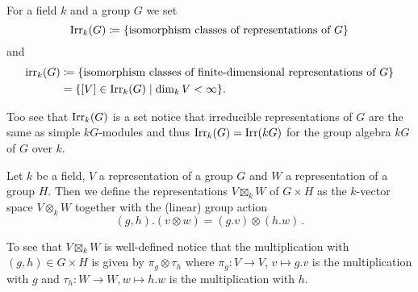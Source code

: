\begin{definition}
  For a field $k$ and a group $G$ we set
  \[
              \operatorname{Irr}_k(G)
    \coloneqq \{ \text{isomorphism classes of representations of $G$} \}
  \]
  and
  \begin{align*}
                \operatorname{irr}_k(G)
    &\coloneqq  \{ \text{isomorphism classes of finite-dimensional representations of $G$} \} \\
    &=          \{ [V] \in \operatorname{Irr}_k(G) \mid \dim_k V < \infty \}.
  \end{align*}
\end{definition}


Too see that $\operatorname{Irr}_k(G)$ is a set notice that irreducible representations of $G$ are the same as simple $kG$-modules and thus $\operatorname{Irr}_k(G) = \operatorname{Irr}(kG)$ for the group algebra $kG$ of $G$ over $k$.


\begin{definition}
  Let $k$ be a field, $V$ a representation of a group $G$ and $W$ a representation of a group $H$.
  Then we define the representations $V \boxtimes_k W$ of $G \times H$ as the $k$-vector space $V \otimes_k W$ together with the (linear) group action
  \[
      (g,h).(v \otimes w)
    = (g.v) \otimes (h.w) \,.
  \]
\end{definition}


To see that $V \boxtimes_k W$ is well-defined notice that the multiplication with $(g,h) \in G \times H$ is given by $\pi_g \otimes \tau_h$ where $\pi_g \colon V \to V$, $v \mapsto g.v$ is the multiplication with $g$ and $\tau_h \colon W \to W, w \mapsto h.w$ is the multiplication with $h$.


